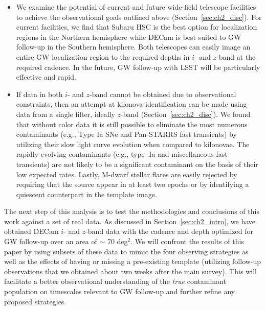 \begin{itemize}
\item We examine the potential of current and future wide-field telescope facilities to achieve the observational goals outlined above (Section~\ref{sec:ch2_disc}). For current facilities, we find that Subaru HSC is the best option for localization regions in the Northern hemisphere while DECam is best suited to GW follow-up in the Southern hemisphere. Both telescopes can easily image an entire GW localization region to the required depths in $i$- and $z$-band at the required cadence. In the future, GW follow-up with LSST will be particularly effective and rapid.
\item  If data in both $i$- and $z$-band cannot be obtained due to observational constraints, then an attempt at kilonova identification can be made using data from a single filter, ideally $z$-band (Section~\ref{sec:ch2_disc}). We found that without color data it is still possible to eliminate the most numerous contaminants (e.g., Type Ia SNe and Pan-STARRS fast transients) by utilizing their slow light curve evolution when compared to kilonovae. The rapidly evolving contaminants (e.g., type .Ia and miscellaneous fast transients) are not likely to be a significant contaminant on the basis of their low expected rates. Lastly, M-dwarf stellar flares are easily rejected by requiring that the source appear in at least two epochs or by identifying a quiescent counterpart in the template image.
\end{itemize}

The next step of this analysis is to test the methodologies and conclusions of this work against a set of real data. As discussed in Section~\ref{sec:ch2_intro}, we have obtained DECam $i$- and $z$-band data with the cadence and depth optimized for GW follow-up over an area of $\sim$ 70 deg$^2$. We will confront the results of this paper by using subsets of these data to mimic the four observing strategies as well as the effects of having or missing a pre-existing template (utilizing follow-up observations that we obtained about two weeks after the main survey). This will facilitate a better observational understanding of the {\em true} contaminant population on timescales relevant to GW follow-up and further refine any proposed strategies.

